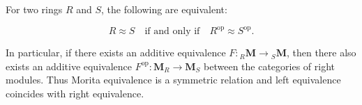 For two rings $R$ and $S$, the following are equivalent:

$$R \approx S \quad \text{if and only if} \quad R^{\text{op}} \approx S^{\text{op}}.$$

In particular, if there exists an additive equivalence $F: {}_R\mathbf{M} \to {}_S\mathbf{M}$, then there also exists an additive equivalence $F^{\text{op}}: \mathbf{M}_R \to \mathbf{M}_S$ between the categories of right modules. Thus Morita equivalence is a symmetric relation and left equivalence coincides with right equivalence.
